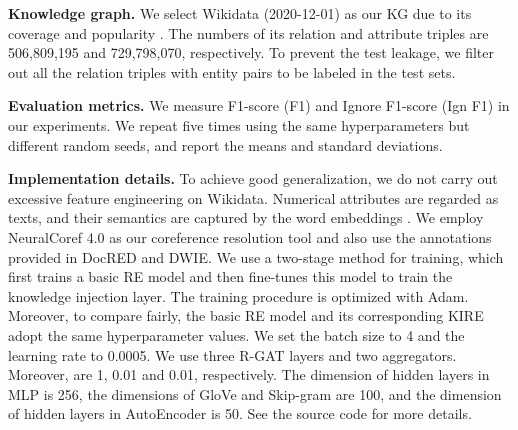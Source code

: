 \documentclass[runningheads]{llncs}
\begin{document}
\textbf{Knowledge graph.} We select Wikidata (2020-12-01) as our KG due to its coverage and popularity \cite{bastos2021recon,vashishth2018reside}. 
The numbers of its relation and attribute triples are 506,809,195 and 729,798,070, respectively. 
To prevent the test leakage, we filter out all the relation triples with entity pairs to be labeled in the test sets. 

\textbf{Evaluation metrics.} 
We measure F1-score (F1) and Ignore F1-score (Ign F1) in our experiments. 
We repeat five times using the same hyperparameters but different random seeds, and report the means and standard deviations.

\textbf{Implementation details.} To achieve good generalization, we do not carry out excessive feature engineering on Wikidata. 
Numerical attributes are regarded as texts, and their semantics are captured by the word embeddings \cite{pennington2014glove}.
We employ NeuralCoref 4.0 as our coreference resolution tool and also use the annotations provided in DocRED and DWIE.
We use a two-stage method for training, which first trains a basic RE model and then fine-tunes this model to train the knowledge injection layer.
The training procedure is optimized with Adam.
Moreover, to compare fairly, the basic RE model and its corresponding KIRE adopt the same hyperparameter values. 
We set the batch size to 4 and the learning rate to 0.0005. 
We use three R-GAT layers and two aggregators.
Moreover,  are 1, 0.01 and 0.01, respectively. 
The dimension of hidden layers in MLP is 256, the dimensions of GloVe and Skip-gram are 100, and the dimension of hidden layers in AutoEncoder is 50. 
See the source code for more details.
\end{document}
